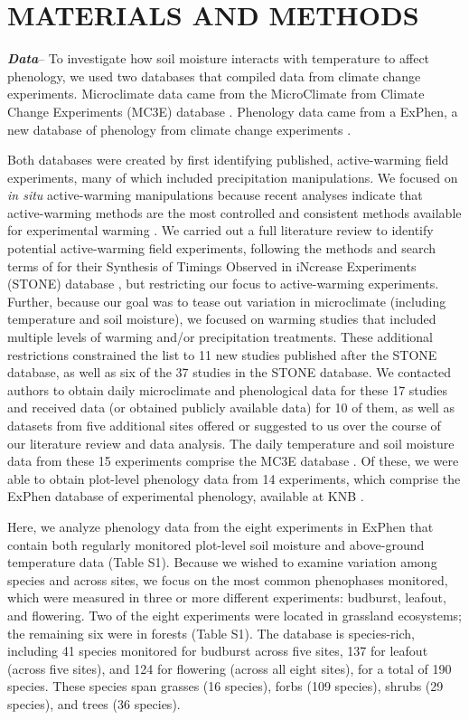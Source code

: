 \documentclass{article}
\begin{document}
\section* {MATERIALS AND METHODS}
\textbf {\emph{Data}}-- To investigate how soil moisture interacts with temperature to affect phenology, we used two databases that compiled data from climate change experiments. Microclimate data came from the MicroClimate from Climate Change Experiments (MC3E) database \citep{ettinger2018, ettinger2019}. Phenology data came from a ExPhen, a new database of phenology from climate change experiments \citep{ettinger2022}. 
\par Both databases were created by first identifying published, active-warming field experiments, many of which included precipitation manipulations. We focused on \textit{in situ} active-warming manipulations because recent analyses indicate that active-warming methods are the most controlled and consistent methods available for experimental warming \citep{kimball2005,kimball2008,aronson2009,wolkovich2012a}. We carried out a full literature review to identify potential active-warming field experiments, following the methods and search terms of \citet{wolkovich2012a} for their Synthesis of Timings Observed in iNcrease Experiments (STONE) database \citep{wolkovich2012}, but restricting our focus to active-warming experiments. Further, because our goal was to tease out variation in microclimate (including temperature and soil moisture), we focused on warming studies that included multiple levels of warming and/or precipitation treatments. These additional restrictions constrained the list to 11 new studies published after the STONE database, as well as six of the 37 studies in the STONE database. We contacted authors to obtain daily microclimate and phenological data for these 17 studies and received data (or obtained publicly available data) for 10 of them, as well as datasets from five additional sites offered or suggested to us over the course of our literature review and data analysis. The daily temperature and soil moisture data from these 15 experiments comprise the MC3E database \citep{ettinger2018,ettinger2019}. Of these, we were able to obtain plot-level phenology data from 14 experiments, which comprise the ExPhen database of experimental phenology, available at KNB \citep{ettinger2022}. 
\par Here, we analyze phenology data from the eight experiments in ExPhen that contain both regularly monitored plot-level soil moisture and above-ground temperature data (Table S1). Because we wished to examine variation among species and across sites, we focus on the most common phenophases monitored, which were measured in three or more different experiments: budburst, leafout, and flowering. Two of the eight experiments were located in grassland ecosystems; the remaining six were in forests (Table S1). The database is species-rich, including 41 species monitored for budburst across five sites, 137 for leafout (across five sites), and 124 for flowering (across all eight sites), for a total of 190 species. These species span grasses (16 species), forbs (109 species), shrubs (29 species), and trees (36 species). 
\end{document}
